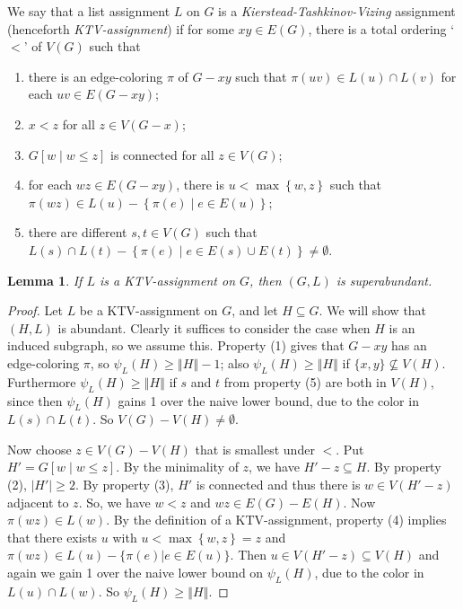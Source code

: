 \documentclass[12pt]{article}
\theoremstyle{plain}
\newtheorem{lem}[thm]{Lemma}
\theoremstyle{definition}
\theoremstyle{remark}
\newcommand{\set}[1]{\left\{ #1 \right\}}
\newcommand{\setbs}[2]{\left\{ #1 \mid #2 \right\}}
\newcommand{\card}[1]{\left|#1\right|}
\newcommand{\size}[1]{\left\Vert#1\right\Vert}
\newcommand{\brackets}[1]{\left[ #1 \right]}
\begin{document}
We say that a list assignment $L$ on $G$ is a \emph{Kierstead-Tashkinov-Vizing} assignment (henceforth \emph{KTV-assignment}) if for some $xy \in E(G)$, there is a total ordering `$<$' of $V(G)$ such that

\begin{enumerate}
\item there is an edge-coloring $\pi$ of $G-xy$ such that $\pi(uv) \in L(u) \cap L(v)$ for each $uv \in E(G - xy)$; 
\item $x < z$ for all $z \in V(G - x)$; 
\item $G\brackets{w \mid w \le z}$ is connected for all $z \in V(G)$; 
\item for each $wz \in E(G - xy)$, there is $u < \max\set{w, z}$ such that $\pi(wz) \in L(u) - \setbs{\pi(e)}{e \in E(u)}$;
\item there are different $s, t \in V(G)$ such that $L(s) \cap L(t) - \setbs{\pi(e)}{e \in E(s) \cup E(t)} \ne \emptyset$.
\end{enumerate}

\begin{lem}\label{KTVImpliesSuperabundant}
If $L$ is a KTV-assignment on $G$, then $(G, L)$ is superabundant.
\end{lem}
\begin{proof}
Let $L$ be a KTV-assignment on $G$, and let $H \subseteq G$.  We will show that
$(H,L)$ is abundant.  
Clearly it suffices to consider the case when $H$ is an induced subgraph, so we
assume this.
Property (1) gives that $G-xy$ has an edge-coloring
$\pi$, so $\psi_L(H)\ge \size{H}-1$; also $\psi_L(H)\ge \size{H}$ if
$\{x,y\}\not\subseteq V(H)$.  Furthermore $\psi_L(H)\ge \size{H}$ if $s$ and
$t$ from property (5) are both in $V(H)$, since then $\psi_L(H)$ gains 1 over
the naive lower bound, due to the color in $L(s)\cap L(t)$.  So $V(G)-
V(H)\ne \emptyset$.

Now choose $z \in V(G) - V(H)$ that is smallest under $<$.  
Put $H' = G\brackets{w \mid w \le z}$.  By the minimality of $z$, we have $H' - z \subseteq H$. By property (2), $\card{H'} \ge 2$.  
By property (3), $H'$ is connected and thus there is $w \in V(H' - z)$ adjacent to $z$. So, we have $w < z$ and $wz\in E(G)-E(H)$.
Now $\pi(wz)\in L(w)$.  By the definition of a KTV-assignment, 
property (4) implies that there exists $u$ with $u < \max\set{w, z} = z$ and $\pi(wz) \in
L(u)-\{\pi(e)|e\in E(u)\}$.  Then $u \in V(H' - z) \subseteq V(H)$ and
again we gain 1 over the naive lower bound on $\psi_L(H)$, due to the color
in $L(u)\cap L(w)$.  So $\psi_L(H)\ge \size{H}$.
\end{proof}
\end{document}
